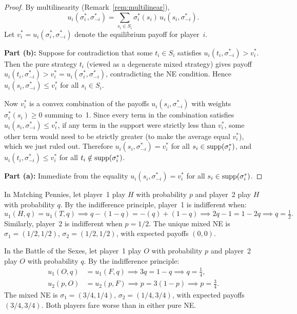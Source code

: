 \documentclass[11pt,a4paper]{article}
\begin{document}
\begin{proof}
By multilinearity (Remark~\ref{rem:multilinear}),
\[
    u_i(\sigma_i^*, \sigma_{-i}^*) = \sum_{s_i \in S_i} \sigma_i^*(s_i)\,
    u_i(s_i, \sigma_{-i}^*).
\]
Let $v_i^* = u_i(\sigma_i^*, \sigma_{-i}^*)$ denote the equilibrium payoff
for player~$i$.

\textbf{Part (b):} Suppose for contradiction that some $t_i \in S_i$
satisfies $u_i(t_i, \sigma_{-i}^*) > v_i^*$. Then the pure strategy $t_i$
(viewed as a degenerate mixed strategy) gives payoff
$u_i(t_i, \sigma_{-i}^*) > v_i^* = u_i(\sigma_i^*, \sigma_{-i}^*)$,
contradicting the NE condition. Hence $u_i(s_i, \sigma_{-i}^*) \leq v_i^*$
for all $s_i \in S_i$.

Now $v_i^*$ is a convex combination of the payoffs $u_i(s_i, \sigma_{-i}^*)$
with weights $\sigma_i^*(s_i) \geq 0$ summing to~1. Since every term in
the combination satisfies $u_i(s_i, \sigma_{-i}^*) \leq v_i^*$, if any
term in the support were strictly less than $v_i^*$, some other term would
need to be strictly greater (to make the average equal $v_i^*$), which we
just ruled out. Therefore $u_i(s_i, \sigma_{-i}^*) = v_i^*$ for all
$s_i \in \operatorname{supp}(\sigma_i^*)$, and $u_i(t_i, \sigma_{-i}^*) \leq v_i^*$
for all $t_i \notin \operatorname{supp}(\sigma_i^*)$.

\textbf{Part (a):} Immediate from the equality
$u_i(s_i, \sigma_{-i}^*) = v_i^*$ for all $s_i \in \operatorname{supp}(\sigma_i^*)$.
\end{proof}

\begin{example}
\label{ex:mixed_mp}
In Matching Pennies, let player~1 play $H$ with probability $p$ and player~2
play $H$ with probability $q$. By the indifference principle, player~1 is
indifferent when:
\[
    u_1(H, q) = u_1(T, q) \implies q - (1-q) = -(q) + (1-q)
    \implies 2q - 1 = 1 - 2q \implies q = \tfrac{1}{2}.
\]
Similarly, player~2 is indifferent when $p = 1/2$. The unique mixed NE is
$\sigma_1 = (1/2, 1/2)$, $\sigma_2 = (1/2, 1/2)$, with expected payoffs
$(0, 0)$.
\end{example}

\begin{example}
\label{ex:mixed_bos}
In the Battle of the Sexes, let player~1 play $O$ with probability $p$ and
player~2 play $O$ with probability $q$. By the indifference principle:
\begin{align*}
    u_1(O, q) &= u_1(F, q) \implies 3q = 1 - q \implies q = \tfrac{1}{4}, \\
    u_2(p, O) &= u_2(p, F) \implies p = 3(1-p) \implies p = \tfrac{3}{4}.
\end{align*}
The mixed NE is $\sigma_1 = (3/4, 1/4)$, $\sigma_2 = (1/4, 3/4)$, with
expected payoffs $(3/4, 3/4)$. Both players fare worse than in either pure NE.
\end{example}
\end{document}
